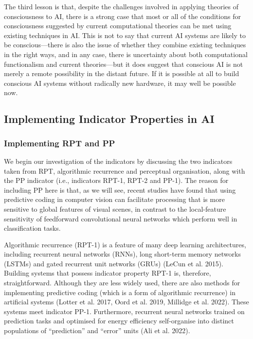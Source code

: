 \documentclass[12pt]{article}
\begin{document}
The third lesson is that, despite the challenges involved in applying theories of consciousness to AI, there is a strong case that most or all of the conditions for consciousness suggested by current computational theories can be met using existing techniques in AI. This is not to say that current AI systems are likely to be conscious—there is also the issue of whether they combine existing techniques in the right ways, and in any case, there is uncertainty about both computational functionalism and current theories—but it does suggest that conscious AI is not merely a remote possibility in the distant future. If it is possible at all to build conscious AI systems without radically new hardware, it may well be possible now.

\subsection{Implementing Indicator Properties in AI}

\subsubsection{Implementing RPT and PP}

We begin our investigation of the indicators by discussing the two indicators taken from RPT, algorithmic recurrence and perceptual organisation, along with the PP indicator (i.e., indicators RPT-1, RPT-2 and PP-1). The reason for including PP here is that, as we will see, recent studies have found that using predictive coding in computer vision can facilitate processing that is more sensitive to global features of visual scenes, in contrast to the local-feature sensitivity of feedforward convolutional neural networks which perform well in classification tasks.

Algorithmic recurrence (RPT-1) is a feature of many deep learning architectures, including recurrent neural networks (RNNs), long short-term memory networks (LSTMs) and gated recurrent unit networks (GRUs) (LeCun et al. 2015). Building systems that possess indicator property RPT-1 is, therefore, straightforward. Although they are less widely used, there are also methods for implementing predictive coding (which is a form of algorithmic recurrence) in artificial systems (Lotter et al. 2017, Oord et al. 2019, Millidge et al. 2022). These systems meet indicator PP-1. Furthermore, recurrent neural networks trained on prediction tasks and optimised for energy efficiency self-organise into distinct populations of ``prediction'' and ``error'' units (Ali et al. 2022).
\end{document}
